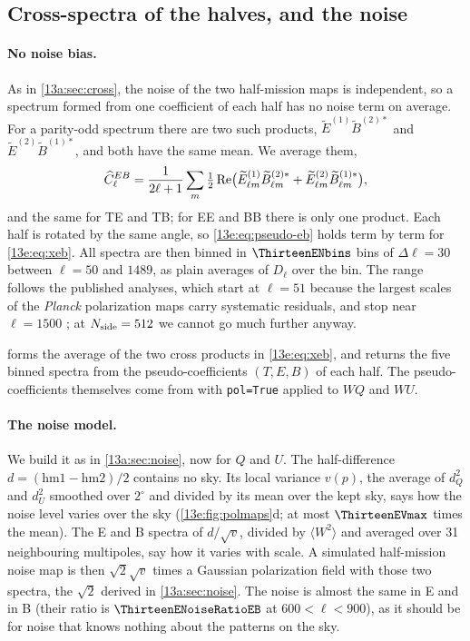 \subsection{Cross-spectra of the halves, and the noise}
\label{13e:sec:noise}

\paragraph{No noise bias.} As in \cref{13a:sec:cross}, the noise of the two half-mission maps is independent,
so a spectrum formed from one coefficient of each half has no noise term on average. For a parity-odd
spectrum there are two such products, $\widetilde E^{(1)}\widetilde B^{(2)*}$ and $\widetilde E^{(2)}\widetilde B^{(1)*}$,
and both have the same mean. We average them,
\begin{equation}
  \widehat C^{EB}_\ell=\frac1{2\ell+1}\sum_m\tfrac12\,{\rm Re}\bigl(\widetilde E^{(1)}_{\ell m}\widetilde B^{(2)*}_{\ell m}
  +\widetilde E^{(2)}_{\ell m}\widetilde B^{(1)*}_{\ell m}\bigr),
  \label{13e:eq:xeb}
\end{equation}
and the same for TE and TB; for EE and BB there is only one product. Each half is rotated by the same
angle, so \eqref{13e:eq:pseudo-eb} holds term by term for \eqref{13e:eq:xeb}. All spectra are then binned in
$\ThirteenENbins$ bins of $\Delta\ell=30$ between $\ell=50$ and $1489$, as plain averages of $D_\ell$ over the
bin. The range follows the published analyses, which start at $\ell=51$ because the largest scales of the
\textit{Planck} polarization maps carry systematic residuals, and stop near $\ell=1500$
\cite{MinamiKomatsu2020}; at $N_{\rm side}=512$ we cannot go much further anyway.


\noindent {} forms the average of the two cross products in \eqref{13e:eq:xeb}, and
 returns the five binned spectra from the pseudo-coefficients $(T,E,B)$ of each half.
The pseudo-coefficients themselves come from  with \texttt{pol=True} applied to $WQ$
and $WU$.

\paragraph{The noise model.} We build it as in \cref{13a:sec:noise}, now for $Q$ and $U$. The half-difference
$d=(\text{hm1}-\text{hm2})/2$ contains no sky. Its local variance $v(p)$, the average of $d_Q^2$ and
$d_U^2$ smoothed over $2^\circ$ and divided by its mean over the kept sky, says how the noise level varies over
the sky (\cref{13e:fig:polmaps}d; at most $\ThirteenEVmax$ times the mean). The E and B spectra of
$d/\sqrt v$, divided by $\langle W^2\rangle$ and averaged over 31 neighbouring multipoles, say how it varies
with scale. A simulated half-mission noise map is then $\sqrt2\sqrt{v}$ times a Gaussian polarization field
with those two spectra, the $\sqrt2$ derived in \cref{13a:sec:noise}. The noise is almost the same in E and in B
(their ratio is $\ThirteenENoiseRatioEB$ at $600<\ell<900$), as it should be for noise that knows nothing
about the patterns on the sky.

